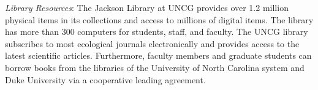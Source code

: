 \documentclass[12pt, class=article, crop=false]{standalone}
\begin{document}
\textit{Library Resources}: The Jackson Library at UNCG provides over 1.2 million physical items in its collections and access to millions of digital items. The library has more than 300 computers for students, staff, and faculty. The UNCG library subscribes to most ecological journals electronically and provides access to the latest scientific articles.
Furthermore, faculty members and graduate students can borrow books from the libraries of the University of North Carolina system and Duke University via a cooperative leading agreement.
\end{document}
